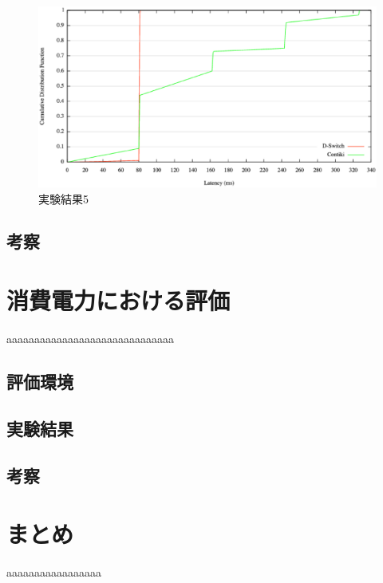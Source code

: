 \begin{figure}[htbp]
 \begin{center}
  \includegraphics[width=120mm]{./images/cdf5.eps}
 \end{center}
 \caption{実験結果5}
 \label{fig:cdf5}
\end{figure}


\subsection{考察}\label{sec:rt_study}


\section{消費電力における評価}
aaaaaaaaaaaaaaaaaaaaaaaaaaaaaa

\subsection{評価環境}


\subsection{実験結果}


\subsection{考察}



\section{まとめ}
aaaaaaaaaaaaaaaaa
